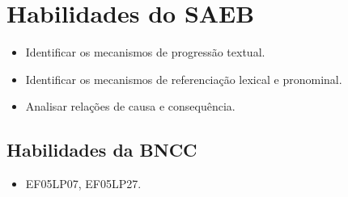 \section*{Habilidades do SAEB}

\begin{itemize}
\item Identificar os mecanismos de progressão textual.

\item Identificar os mecanismos de referenciação lexical e pronominal.

\item Analisar relações de causa e consequência.
\end{itemize}

\subsection{Habilidades da BNCC}

\begin{itemize}
\item EF05LP07, EF05LP27.
\end{itemize}

